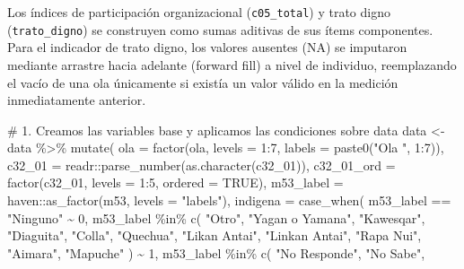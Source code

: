 \documentclass[
  spanish,
  a4paper,
  oneside]{scrbook}
\newenvironment{Shaded}{\begin{snugshade}}{\end{snugshade}}
\newcommand{\AttributeTok}[1]{\textcolor[rgb]{0.40,0.45,0.13}{#1}}
\newcommand{\CommentTok}[1]{\textcolor[rgb]{0.37,0.37,0.37}{#1}}
\newcommand{\ConstantTok}[1]{\textcolor[rgb]{0.56,0.35,0.01}{#1}}
\newcommand{\DecValTok}[1]{\textcolor[rgb]{0.68,0.00,0.00}{#1}}
\newcommand{\FunctionTok}[1]{\textcolor[rgb]{0.28,0.35,0.67}{#1}}
\newcommand{\NormalTok}[1]{\textcolor[rgb]{0.00,0.23,0.31}{#1}}
\newcommand{\OtherTok}[1]{\textcolor[rgb]{0.00,0.23,0.31}{#1}}
\newcommand{\SpecialCharTok}[1]{\textcolor[rgb]{0.37,0.37,0.37}{#1}}
\newcommand{\StringTok}[1]{\textcolor[rgb]{0.13,0.47,0.30}{#1}}
\begin{document}
Los índices de participación organizacional (\texttt{c05\_total}) y
trato digno (\texttt{trato\_digno}) se construyen como sumas aditivas de
sus ítems componentes. Para el indicador de trato digno, los valores
ausentes (NA) se imputaron mediante arrastre hacia adelante (forward
fill) a nivel de individuo, reemplazando el vacío de una ola únicamente
si existía un valor válido en la medición inmediatamente anterior.

\begin{Shaded}
\begin{Highlighting}[]
\CommentTok{\# 1. Creamos las variables base y aplicamos las condiciones sobre \textquotesingle{}data\textquotesingle{}}
\NormalTok{data }\OtherTok{\textless{}{-}}\NormalTok{ data }\SpecialCharTok{\%\textgreater{}\%}
  \FunctionTok{mutate}\NormalTok{(}
    \AttributeTok{ola =} \FunctionTok{factor}\NormalTok{(ola, }\AttributeTok{levels =} \DecValTok{1}\SpecialCharTok{:}\DecValTok{7}\NormalTok{, }\AttributeTok{labels =} \FunctionTok{paste0}\NormalTok{(}\StringTok{"Ola "}\NormalTok{, }\DecValTok{1}\SpecialCharTok{:}\DecValTok{7}\NormalTok{)),}
    \AttributeTok{c32\_01 =}\NormalTok{ readr}\SpecialCharTok{::}\FunctionTok{parse\_number}\NormalTok{(}\FunctionTok{as.character}\NormalTok{(c32\_01)),}
    \AttributeTok{c32\_01\_ord =} \FunctionTok{factor}\NormalTok{(c32\_01, }\AttributeTok{levels =} \DecValTok{1}\SpecialCharTok{:}\DecValTok{5}\NormalTok{, }\AttributeTok{ordered =} \ConstantTok{TRUE}\NormalTok{),}
    \AttributeTok{m53\_label =}\NormalTok{ haven}\SpecialCharTok{::}\FunctionTok{as\_factor}\NormalTok{(m53, }\AttributeTok{levels =} \StringTok{"labels"}\NormalTok{),}
    \AttributeTok{indigena =} \FunctionTok{case\_when}\NormalTok{(}
\NormalTok{      m53\_label }\SpecialCharTok{==} \StringTok{"Ninguno"} \SpecialCharTok{\textasciitilde{}} \DecValTok{0}\NormalTok{,}
\NormalTok{      m53\_label }\SpecialCharTok{\%in\%} \FunctionTok{c}\NormalTok{(}
        \StringTok{"Otro"}\NormalTok{, }\StringTok{"Yagan o Yamana"}\NormalTok{, }\StringTok{"Kawesqar"}\NormalTok{, }\StringTok{"Diaguita"}\NormalTok{, }\StringTok{"Colla"}\NormalTok{,}
        \StringTok{"Quechua"}\NormalTok{, }\StringTok{"Likan Antai"}\NormalTok{, }\StringTok{"Linkan Antai"}\NormalTok{, }\StringTok{"Rapa Nui"}\NormalTok{,}
        \StringTok{"Aimara"}\NormalTok{, }\StringTok{"Mapuche"}
\NormalTok{      ) }\SpecialCharTok{\textasciitilde{}} \DecValTok{1}\NormalTok{,}
\NormalTok{      m53\_label }\SpecialCharTok{\%in\%} \FunctionTok{c}\NormalTok{(}
        \StringTok{"No Responde"}\NormalTok{, }\StringTok{"No Sabe"}\NormalTok{,}

\end{Highlighting}
\end{Shaded}
\end{document}
